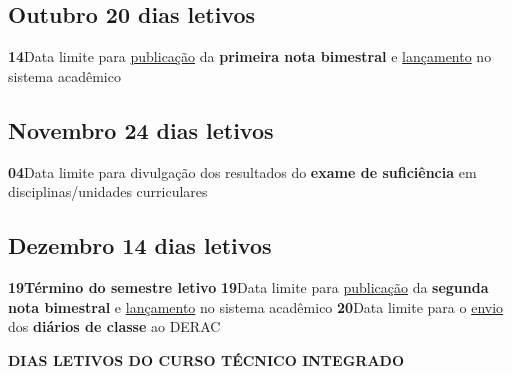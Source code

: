 \documentclass[thesis]{hmcposter}
\begin{document}
\begin{poster}
\subsection{Outubro \hfill 20 dias letivos}\textbf{14}\qquad Data limite para \underline{publicação} da \textbf{primeira nota bimestral} e \underline{lançamento} no sistema acadêmico \newline \null\subsection{Novembro \hfill 24 dias letivos}\textbf{04}\qquad Data limite para divulgação dos resultados do \textbf{exame de suficiência} em disciplinas/unidades curriculares \newline \null\subsection{Dezembro \hfill 14 dias letivos}\textbf{19}\qquad \textbf{Término do semestre letivo} \newline \null\textbf{19}\qquad Data limite para \underline{publicação} da \textbf{segunda nota bimestral} e \underline{lançamento} no sistema acadêmico \newline \null\textbf{20}\qquad Data limite para o \underline{envio} dos \textbf{diários de classe} ao DERAC \newline \null\newpage
~
\vfill
\begin{center}
\large \textbf{DIAS LETIVOS DO CURSO TÉCNICO INTEGRADO}
\newline
\null
\newline
\begin{table}
\centering
{}
\end{table}
\newline
\null
\newline
\end{center}

\end{poster}
\end{document}
